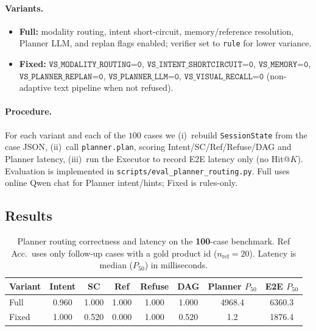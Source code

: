 \paragraph{Variants.}
\begin{itemize}
  \item \textbf{Full:} modality routing, intent short-circuit, memory/reference resolution,
    Planner LLM, and replan flags enabled; verifier set to \texttt{rule} for lower variance.
  \item \textbf{Fixed:} $\texttt{VS\_MODALITY\_ROUTING{=}0}$,
    $\texttt{VS\_INTENT\_SHORTCIRCUIT{=}0}$,
    $\texttt{VS\_MEMORY{=}0}$,
    $\texttt{VS\_PLANNER\_REPLAN{=}0}$,
    $\texttt{VS\_PLANNER\_LLM{=}0}$,
    $\texttt{VS\_VISUAL\_RECALL{=}0}$
    (non-adaptive text pipeline when not refused).
\end{itemize}

\paragraph{Procedure.}
For each variant and each of the $100$ cases we (i)~rebuild \texttt{SessionState} from the case JSON,
(ii)~call \texttt{planner.plan}, scoring Intent/SC/Ref/Refuse/DAG and Planner latency,
(iii)~run the Executor to record E2E latency only (no Hit@$K$).
Evaluation is implemented in \texttt{scripts/eval\_planner\_routing.py}.
Full uses online Qwen chat for Planner intent/hints; Fixed is rules-only.

\subsection{Results}
\begin{table}[t]
  \centering
  \caption{Planner routing correctness and latency on the \textbf{100}-case benchmark.
  Ref Acc.\ uses only follow-up cases with a gold product id ($n_{\mathrm{ref}}=20$).
  Latency is median ($P_{50}$) in milliseconds.}
  \label{tab:planner-routing}
  \begin{tabular}{lccccccc}
    \toprule
    Variant & Intent & SC & Ref & Refuse & DAG & Planner $P_{50}$ & E2E $P_{50}$ \\
    \midrule
    Full  & 0.960 & 1.000 & 1.000 & 1.000 & 1.000 & 4968.4 & 6360.3 \\
    Fixed & 1.000 & 0.520 & 0.000 & 1.000 & 0.520 & 1.2    & 1876.4 \\
    \bottomrule
  \end{tabular}
\end{table}


